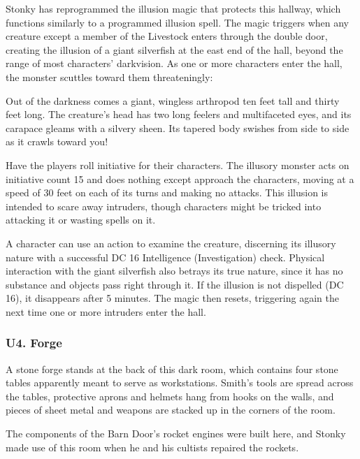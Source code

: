 \documentclass[10pt,a4paper,twoside,bg=print,twocolumn,openany,nodeprecatedcode]{dndbook}
\begin{document}
Stonky has reprogrammed the illusion magic that protects this hallway, which functions similarly to a programmed illusion spell. The magic triggers when any creature except a member of the Livestock enters through the double door, creating the illusion of a giant silverfish at the east end of the hall, beyond the range of most characters' darkvision. As one or more characters enter the hall, the monster scuttles toward them threateningly:

\begin{DndReadAloud}{}
Out of the darkness comes a giant, wingless arthropod ten feet tall and thirty feet long. The creature's head has two long feelers and multifaceted eyes, and its carapace gleams with a silvery sheen. Its tapered body swishes from side to side as it crawls toward you!

\end{DndReadAloud}

Have the players roll initiative for their characters. The illusory monster acts on initiative count 15 and does nothing except approach the characters, moving at a speed of 30 feet on each of its turns and making no attacks. This illusion is intended to scare away intruders, though characters might be tricked into attacking it or wasting spells on it.

A character can use an action to examine the creature, discerning its illusory nature with a successful DC 16 Intelligence (Investigation) check. Physical interaction with the giant silverfish also betrays its true nature, since it has no substance and objects pass right through it. If the illusion is not dispelled (DC 16), it disappears after 5 minutes. The magic then resets, triggering again the next time one or more intruders enter the hall.

\subsubsection{U4. Forge}
\begin{DndReadAloud}{}
A stone forge stands at the back of this dark room, which contains four stone tables apparently meant to serve as workstations. Smith's tools are spread across the tables, protective aprons and helmets hang from hooks on the walls, and pieces of sheet metal and weapons are stacked up in the corners of the room.

\end{DndReadAloud}

The components of the Barn Door's rocket engines were built here, and Stonky made use of this room when he and his cultists repaired the rockets.
\end{document}

